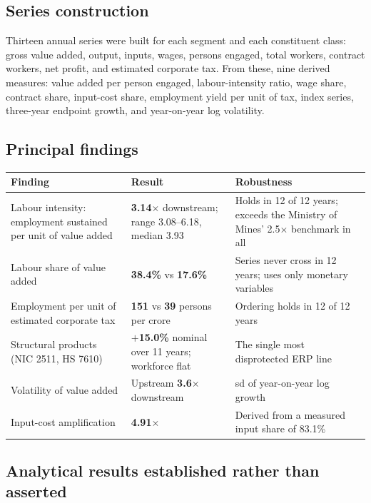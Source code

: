\documentclass[11pt, a4paper]{article}
\begin{document}
\subsection{Series construction}

Thirteen annual series were built for each segment and each constituent class:
gross value added, output, inputs, wages, persons engaged, total workers, contract
workers, net profit, and estimated corporate tax. From these, nine derived measures:
value added per person engaged, labour-intensity ratio, wage share, contract share,
input-cost share, employment yield per unit of tax, index series, three-year endpoint
growth, and year-on-year log volatility.

\subsection{Principal findings}

\begin{table}[H]
\centering\small
\begin{tabular}{p{6.6cm}p{4.0cm}p{4.4cm}}
\toprule
\textbf{Finding} & \textbf{Result} & \textbf{Robustness} \\
\midrule
Labour intensity: employment sustained per unit of value added & \textbf{3.14$\times$} downstream; range 3.08--6.18, median 3.93 & Holds in 12 of 12 years; exceeds the Ministry of Mines' 2.5$\times$ benchmark in all \\
\addlinespace
Labour share of value added & \textbf{38.4\%} vs \textbf{17.6\%} & Series never cross in 12 years; uses only monetary variables \\
\addlinespace
Employment per unit of estimated corporate tax & \textbf{151} vs \textbf{39} persons per crore & Ordering holds in 12 of 12 years \\
\addlinespace
Structural products (NIC 2511, HS 7610) & $+$\textbf{15.0\%} nominal over 11 years; workforce flat & The single most disprotected ERP line \\
\addlinespace
Volatility of value added & Upstream \textbf{3.6$\times$} downstream & sd of year-on-year log growth \\
\addlinespace
Input-cost amplification & \textbf{4.91$\times$} & Derived from a measured input share of 83.1\% \\
\bottomrule
\end{tabular}
\end{table}

\subsection{Analytical results established rather than asserted}
\end{document}

